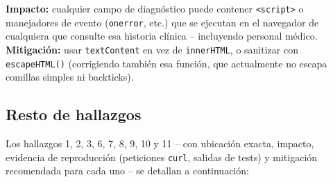 \documentclass[11pt,a4paper]{article}
\begin{document}
\textbf{Impacto:} cualquier campo de diagn\'ostico puede contener
\texttt{<script>} o manejadores de evento (\texttt{onerror}, etc.) que se
ejecutan en el navegador de cualquiera que consulte esa historia cl\'inica
-- incluyendo personal m\'edico. \textbf{Mitigaci\'on:} usar
\texttt{textContent} en vez de \texttt{innerHTML}, o sanitizar con
\texttt{escapeHTML()} (corrigiendo tambi\'en esa funci\'on, que actualmente
no escapa comillas simples ni backticks).

\subsection*{Resto de hallazgos}

Los hallazgos 1, 2, 3, 6, 7, 8, 9, 10 y 11 -- con ubicaci\'on exacta,
impacto, evidencia de reproducci\'on (peticiones \texttt{curl}, salidas de
tests) y mitigaci\'on recomendada para cada uno -- se detallan a
continuaci\'on:
\end{document}
